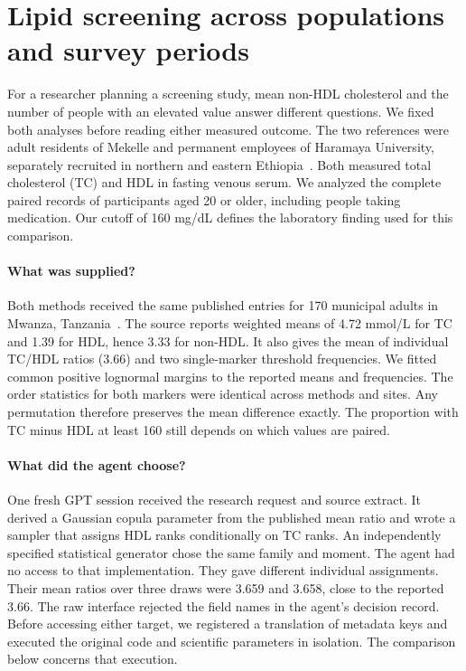 \documentclass[sigconf,anonymous,review]{acmart}
\begin{document}
\section{Lipid screening across populations and survey periods}
\label{sec:nonhdl}
For a researcher planning a screening study, mean non-HDL cholesterol and the number of people with an elevated value answer different questions. We fixed both analyses before reading either measured outcome. The two references were adult residents of Mekelle and permanent employees of Haramaya University, separately recruited in northern and eastern Ethiopia~\cite{mekelle,haramaya}. Both measured total cholesterol (TC) and HDL in fasting venous serum. We analyzed the complete paired records of participants aged 20 or older, including people taking medication. Our cutoff of 160 mg/dL defines the laboratory finding used for this comparison.

\paragraph{What was supplied?}
Both methods received the same published entries for 170 municipal adults in Mwanza, Tanzania~\cite{kavishe}. The source reports weighted means of 4.72 mmol/L for TC and 1.39 for HDL, hence 3.33 for non-HDL. It also gives the mean of individual TC/HDL ratios (3.66) and two single-marker threshold frequencies. We fitted common positive lognormal margins to the reported means and frequencies. The order statistics for both markers were identical across methods and sites. Any permutation therefore preserves the mean difference exactly. The proportion with TC minus HDL at least 160 still depends on which values are paired.

\paragraph{What did the agent choose?}
One fresh GPT session received the research request and source extract. It derived a Gaussian copula parameter from the published mean ratio and wrote a sampler that assigns HDL ranks conditionally on TC ranks. An independently specified statistical generator chose the same family and moment. The agent had no access to that implementation. They gave different individual assignments. Their mean ratios over three draws were 3.659 and 3.658, close to the reported 3.66. The raw interface rejected the field names in the agent's decision record. Before accessing either target, we registered a translation of metadata keys and executed the original code and scientific parameters in isolation. The comparison below concerns that execution.
\end{document}
